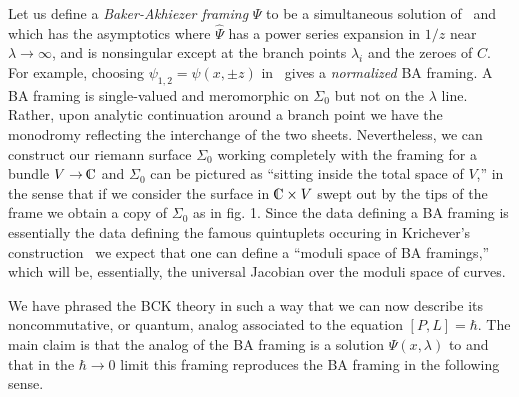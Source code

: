 Let us define a {\it Baker-Akhiezer framing}
$\Psi$ to be a simultaneous solution of \frm\ and 
\eqn\bkfrm{
\CP\Psi=\Psi \sigma_3 \mu(\lambda)\qquad ,
}
which has the asymptotics
\eqn{}
where $\hat\Psi$ has a power series expansion in $1/z$
near $\lambda\to\infty$, and is nonsingular except at the branch points
$\lambda_i$ and the zeroes of $C$.
For example, 
choosing $\psi_{1,2}=\psi(x,\pm z)$ in \frmi\  gives 
a {\it normalized} BA framing.
A BA framing is single-valued and meromorphic
on $\Sigma_0$ but not on the $\lambda$
line. Rather, upon analytic continuation around a branch point 
we have the monodromy 
\eqn\mndrmy{
\Psi\rightarrow \Psi\sigma_1 \qquad ,
}
reflecting the interchange of the two sheets.
Nevertheless, we can construct our riemann surface $\Sigma_0$ 
working completely 
with the framing for a bundle $V\to\IC$ and $\Sigma_0$ can 
be pictured  as ``sitting inside the total space of $V$,'' 
in the sense that if we consider the surface in $\IC\times V$
swept out by the tips of the frame we obtain a 
copy of $\Sigma_0$ as in fig. 1.
Since the data defining a BA framing is essentially the data
defining the famous quintuplets occuring in Krichever's
construction \segal\ we expect that one can define a
``moduli space of BA framings,'' which will be, essentially,
the universal Jacobian over the moduli space of curves.

We have phrased the BCK theory in such a way that we can 
now describe its noncommutative, or quantum, analog associated
to the equation $[P,L]=\hbar$. The main claim is that the
analog of 
the BA framing is a solution $\Psi(x,\lambda)$ to
\eqn{}
and that in the $\hbar\to 0$ limit this framing reproduces 
the BA framing in the following sense. 

